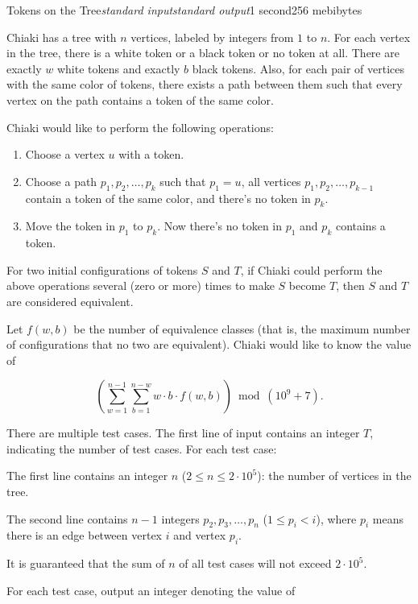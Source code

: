 \begin{problem}{Tokens on the Tree}{\textsl{standard input}}{\textsl{standard output}}{1 second}{256 mebibytes}

Chiaki has a tree with $n$ vertices, labeled by integers from $1$ to $n$. For each vertex in the tree, there is a white token or a black token or no token at all. There are exactly $w$ white tokens and exactly $b$ black tokens. Also, for each pair of vertices with the same color of tokens, there exists a path between them such that every vertex on the path contains a token of the same color.

Chiaki would like to perform the following operations:

\begin{enumerate}
\item Choose a vertex $u$ with a token.
\item Choose a path $p_1,p_2,\dots,p_k$ such that $p_1=u$, all vertices $p_1,p_2,\dots,p_{k-1}$ contain a token of the same color, and there's no token in $p_k$.
\item Move the token in $p_1$ to $p_k$. Now there's no token in $p_1$ and $p_k$ contains a token.
\end{enumerate}

For two initial configurations of tokens $S$ and $T$, if Chiaki could perform the above operations several (zero or more) times to make $S$ become $T$, then $S$ and $T$ are considered equivalent.

Let $f(w, b)$ be the number of equivalence classes (that is, the maximum number of configurations that no two are equivalent). Chiaki would like to know the value of

$$\left(\sum\limits_{w=1}^{n-1}\sum\limits_{b=1}^{n-w} w \cdot b \cdot f(w, b) \right)\bmod (10^9+7)\text{.}$$

\InputFile
There are multiple test cases. The first line of input contains an integer $T$, indicating the number of test cases. For each test case:

The first line contains an integer $n$ ($2 \le n \le 2 \cdot 10^5$): the number of vertices in the tree.

The second line contains $n-1$ integers $p_2,p_3,\ldots,p_n$ ($1 \le p_i < i$), where $p_i$ means there is an edge between vertex $i$ and vertex $p_i$.

It is guaranteed that the sum of $n$ of all test cases will not exceed $2 \cdot 10^5$.


\OutputFile
For each test case, output an integer denoting the value of 


\end{problem}
